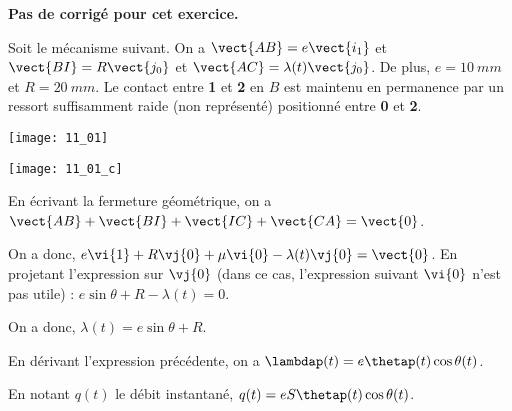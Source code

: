 \normalfalse \difficiletrue \tdifficilefalse
\correctiontrue


\setcounter{question}{0}
\ifcorrection
\else
\textbf{Pas de corrigé pour cet exercice.}
\fi

\ifprof
\else
Soit le mécanisme suivant. On a $\vect{AB}=e\vect{i_1}$ et $\vect{BI}=R\vect{j_0}$ et $\vect{AC}=\lambda(t)\vect{j_0}$. De plus, 
$e=\SI{10}{mm}$ et $R=\SI{20}{mm}$. Le contact entre \textbf{1} et \textbf{2} en $B$ est maintenu en permanence par un ressort suffisamment raide (non représenté) positionné entre \textbf{0} et \textbf{2}. 
\begin{center}
\texttt{[image: 11\_01]}
\end{center}
\fi


\ifprof
\begin{center}
\texttt{[image: 11\_01\_c]}
\end{center}

\else
\fi


\ifprof

En écrivant la fermeture géométrique, on a $\vect{AB}+\vect{BI}+\vect{IC}+\vect{CA}=\vect{0}$.

On a donc, $e\vi{1}+R\vj{0}+\mu\vi{0}-\lambda(t)\vj{0}=\vect{0}$. En projetant l'expression sur $\vj{0}$ (dans ce cas, l'expression suivant $\vi{0}$ n'est pas utile) :
$ e\sin\theta +R - \lambda(t)=0$.

On a donc, $\lambda(t)=e\sin\theta +R $.
\else
\fi

\ifprof

En dérivant l'expression précédente, on a $\lambdap (t)=e\thetap(t) \cos\theta (t) $.
\else
\fi

\ifprof

En notant $q(t)$ le débit instantané, $q(t)=eS\thetap(t) \cos\theta (t)$.
\else
\fi

\ifprof


